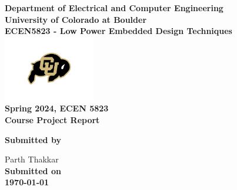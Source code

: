 \begin{titlepage}
\center %

\textbf{\large Department of Electrical and Computer Engineering}\\[0.5cm]
\textbf{\Large University of Colorado at Boulder}\\[1cm]
\textbf{\large ECEN5823 - Low Power Embedded Design Techniques}\\[2cm]
\includegraphics[width=0.3\textwidth]{figures/cu}\\[2cm] 

	
\textbf{\Huge Spring 2024, ECEN 5823 }\\[0.2cm]

\textbf{\Large Course Project Report}\\[5cm]




\vfill

\textbf{\large Submitted by}

{\large Parth Thakkar}\\[0.5cm]


\textbf{\large Submitted on}\\
\textbf{\Large \today} %


\vfill %

\end{titlepage}